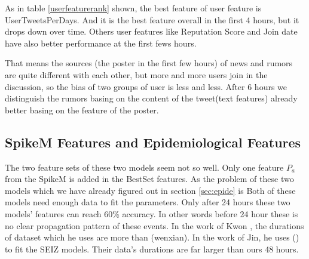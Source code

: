 As in table \ref{userfeaturerank} shown, the best feature of user feature is UserTweetsPerDays. And it is the best feature overall in the first 4 hours, but it drops down over time. Others user features like Reputation Score and Join date have also better performance at the first fews hours. 

That means the sources (the poster in the first few hours) of news and rumors are quite different with each other, but more and more users join in the discussion, so the bias of two groups of user is less and less. After 6 hours we distinguish the rumors basing on the content of the tweet(text features) already better basing on the feature of the poster.
 
\begin{table}[!h]
\centering
{}
\caption{Rank of Part of User Feature}
\label{userfeaturerank}
\end{table}
\subsection{SpikeM Features and Epidemiological Features}
The two feature sets of these two models seem not so well. 
Only one feature $P_a$ from the SpikeM is added in the BestSet features. 
As the problem of these two models which we have already figured out in section \ref{sec:epide} is Both of these models need enough data to fit the parameters. Only after 24 hours these two models' features can reach 60\% accuracy. In other words before 24 hour these is no clear propagation pattern of these events. In the work of Kwon \cite{kwon2013prominent}, the durations of dataset which he uses are more than (wenxian). In the work of Jin\cite{jin2013epidemiological}, he uses () to fit the SEIZ models. Their data's durations are far larger than ours 48 hours.
 
